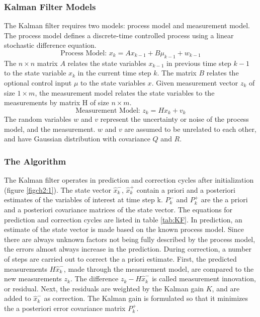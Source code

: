 \subsubsection{Kalman Filter Models}

The Kalman filter requires two models: process model and measurement
model. The process model defines a discrete-time controlled process
using a linear stochastic difference equation.
\begin{equation}
\text{Process Model: }x_k = Ax_{k-1}+B\mu_{k-1}+w_{k-1}
\end{equation}
\noindent The $n\times n$ matrix $A$ relates the state variables
$x_{k-1}$ in previous time step $k-1$ to the state variable $x_{k}$ in
the current time step $k$. The matrix $B$ relates the optional control
input $\mu$ to the state variables $x$. Given measurement vector $z_k$
of size $1 \times m$, the measurement model relates the state
variables to the measurements by matrix H of size $n \times m$. 
\begin{equation}
\text{Measurement Model: }z_k = Hx_k+v_k
\end{equation}
The random variables $w$ and $v$ represent the uncertainty or noise of
the process model, and the measurement. $w$ and $v$ are assumed to be
unrelated to each other, and have Gaussian distribution with covariance
$Q$ and $R$.

\subsubsection{The Algorithm}
The Kalman filter operates in prediction and correction cycles after
initialization (figure \ref{figch2:1}). The state vector
$\hat{x}^-_k$, $\hat{x}^+_k$ contain a priori and a posteriori
estimates of the variables of interest at time step k. $P^-_k$ and
$P^+_k$ are the a priori and a posteriori covariance matrices of the
state vector. The equations for prediction and correction cycles are
listed in table \ref{tab:KF}. In prediction, an estimate of the state
vector is made based on the known process model. Since there are
always unknown factors not being fully described by the process model,
the errors almost always increase in the prediction. During
correction, a number of steps are carried out to correct the a priori
estimate. First, the predicted measurements $H\hat{x}^-_k$, made
through the measurement model, are compared to the new measurements
$z_k$. The difference $z_k - H\hat{x}^-_k$ is called measurement
innovation, or residual. Next, the residuals are weighted by the
Kalman gain $K$, and are added to $\hat{x}^-_k$ as correction. The
Kalman gain is formulated so that it minimizes the a posteriori error
covariance matrix $P^+_k$.

